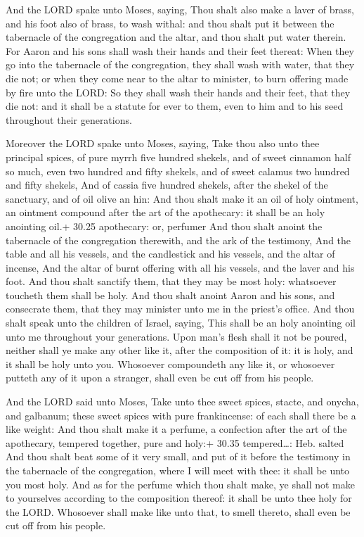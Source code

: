  And the LORD spake unto Moses, saying, 
Thou shalt also make a laver of brass, and his foot also of brass, to
wash withal: and thou shalt put it between the tabernacle of the
congregation and the altar, and thou shalt put water therein.
 For Aaron and his sons shall wash their hands and their
feet thereat:  When they go into the tabernacle of the
congregation, they shall wash with water, that they die not; or when
they come near to the altar to minister, to burn offering made by fire
unto the LORD:  So they shall wash their hands and their
feet, that they die not: and it shall be a statute for ever to them,
even to him and to his seed throughout their generations.

 Moreover the LORD spake unto Moses, saying,
 Take thou also unto thee principal spices, of pure myrrh
five hundred shekels, and of sweet cinnamon half so much, even two
hundred and fifty shekels, and of sweet calamus two hundred and fifty
shekels,  And of cassia five hundred shekels, after the
shekel of the sanctuary, and of oil olive an hin:  And thou
shalt make it an oil of holy ointment, an ointment compound after the
art of the apothecary: it shall be an holy anointing oil.+ 30.25
apothecary: or, perfumer  And thou shalt anoint the
tabernacle of the congregation therewith, and the ark of the testimony,
 And the table and all his vessels, and the candlestick and
his vessels, and the altar of incense,  And the altar of
burnt offering with all his vessels, and the laver and his foot.
 And thou shalt sanctify them, that they may be most holy:
whatsoever toucheth them shall be holy.  And thou shalt
anoint Aaron and his sons, and consecrate them, that they may minister
unto me in the priest's office.  And thou shalt speak unto
the children of Israel, saying, This shall be an holy anointing oil unto
me throughout your generations.  Upon man's flesh shall it
not be poured, neither shall ye make any other like it, after the
composition of it: it is holy, and it shall be holy unto you.
 Whosoever compoundeth any like it, or whosoever putteth
any of it upon a stranger, shall even be cut off from his people.

 And the LORD said unto Moses, Take unto thee sweet
spices, stacte, and onycha, and galbanum; these sweet spices with pure
frankincense: of each shall there be a like weight:  And
thou shalt make it a perfume, a confection after the art of the
apothecary, tempered together, pure and holy:+ 30.35 tempered\ldots:
Heb. salted  And thou shalt beat some of it very small, and
put of it before the testimony in the tabernacle of the congregation,
where I will meet with thee: it shall be unto you most holy.
 And as for the perfume which thou shalt make, ye shall not
make to yourselves according to the composition thereof: it shall be
unto thee holy for the LORD.  Whosoever shall make like
unto that, to smell thereto, shall even be cut off from his people.

